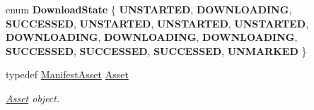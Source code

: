 \begin{DoxyCompactItemize}
\item 
\mbox{\label{classManifest_a810f11fce45c13d07dc3466200e8561e}} 
enum {\bfseries Download\+State} \{ \newline
{\bfseries U\+N\+S\+T\+A\+R\+T\+ED}, 
{\bfseries D\+O\+W\+N\+L\+O\+A\+D\+I\+NG}, 
{\bfseries S\+U\+C\+C\+E\+S\+S\+ED}, 
{\bfseries U\+N\+S\+T\+A\+R\+T\+ED}, 
\newline
{\bfseries U\+N\+S\+T\+A\+R\+T\+ED}, 
{\bfseries U\+N\+S\+T\+A\+R\+T\+ED}, 
{\bfseries D\+O\+W\+N\+L\+O\+A\+D\+I\+NG}, 
{\bfseries D\+O\+W\+N\+L\+O\+A\+D\+I\+NG}, 
\newline
{\bfseries D\+O\+W\+N\+L\+O\+A\+D\+I\+NG}, 
{\bfseries S\+U\+C\+C\+E\+S\+S\+ED}, 
{\bfseries S\+U\+C\+C\+E\+S\+S\+ED}, 
{\bfseries S\+U\+C\+C\+E\+S\+S\+ED}, 
\newline
{\bfseries U\+N\+M\+A\+R\+K\+ED}
 \}
\item 
\mbox{\label{classManifest_a2ec5d93f2f032529518f0651cfd7e3d7}} 
typedef \hyperlink{structManifestAsset}{Manifest\+Asset} \hyperlink{classManifest_a2ec5d93f2f032529518f0651cfd7e3d7}{Asset}
\begin{DoxyCompactList}\small\item\em \hyperlink{structManifest_1_1Asset}{Asset} object. \end{DoxyCompactList}\end{DoxyCompactItemize}
